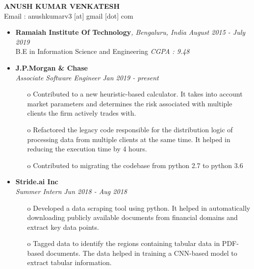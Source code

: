 \documentclass[11pt,a4paper]{article}
\begin{document}
\begin{center}
    \textbf{\huge ANUSH KUMAR VENKATESH}
    \\ Email : anushkumarv3 [at] gmail [dot] com
\end{center}

\colorbox{gray}{}
    \begin{itemize}
    \item \textbf{Ramaiah Institute Of Technology}\emph{, Bengaluru, India} \hfill \textit{August 2015 - July 2019}
    \\ B.E in Information Science and Engineering \emph{CGPA : 9.48}
\end{itemize}

{
\colorbox{gray}{}

  \begin{itemize}
      \item \textbf{J.P.Morgan \& Chase}
      \\ \emph{Associate Software Engineer} \hfill \textit{Jan 2019 - present}  
      \begin{itemize}
          \item[o] Contributed to a new heuristic-based calculator. It takes into account market parameters and determines the risk associated with multiple clients the firm actively trades with.
          \item[o] Refactored the legacy code responsible for the distribution logic of processing data from multiple clients at the same time. It helped in reducing the execution time by 4 hours.
          \item[o] Contributed to migrating the codebase from python 2.7 to python 3.6
      \end{itemize}
      \item \textbf{Stride.ai Inc}
      \\ \emph{Summer Intern} \hfill \textit{Jun 2018 - Aug 2018}    
      \begin{itemize}
          \item[o] Developed a data scraping tool using python. It helped in automatically downloading publicly available documents from financial domains and extract key data points.
          \item[o] Tagged data to identify the regions containing tabular data in PDF-based documents. The data helped in training a CNN-based model to extract tabular information. 
      \end{itemize}
  \end{itemize}
}
\end{document}
